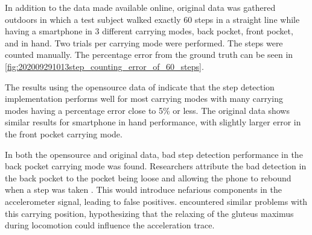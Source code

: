 In addition to the data made available online, original data was gathered outdoors in which a test subject walked exactly 60 steps in a straight line while having a smartphone in 3 different carrying modes, back pocket, front pocket, and in hand. Two trials per carrying mode were performed. The steps were counted manually. The percentage error from the ground truth can be seen in \cref{fig:202009291013step_counting_error_of_60_steps}.

The results using the opensource data of \citet{Salvi2018} indicate that the step detection implementation performs well for most carrying modes with many carrying modes having a percentage error close to 5\% or less. The original data shows similar results for smartphone in hand performance, with slightly larger error in the front pocket carrying mode.\par 

In both the opensource and original data, bad step detection performance in the back pocket carrying mode was found. Researchers attribute the bad detection in the back pocket to the pocket being loose and allowing the phone to rebound when a step was taken \cite{Salvi2018}. This would introduce nefarious components in the accelerometer signal, leading to false positives. \citet{Brajdic2013} encountered similar problems with this carrying position, hypothesizing that the relaxing of the gluteus maximus during locomotion could influence the acceleration trace.

